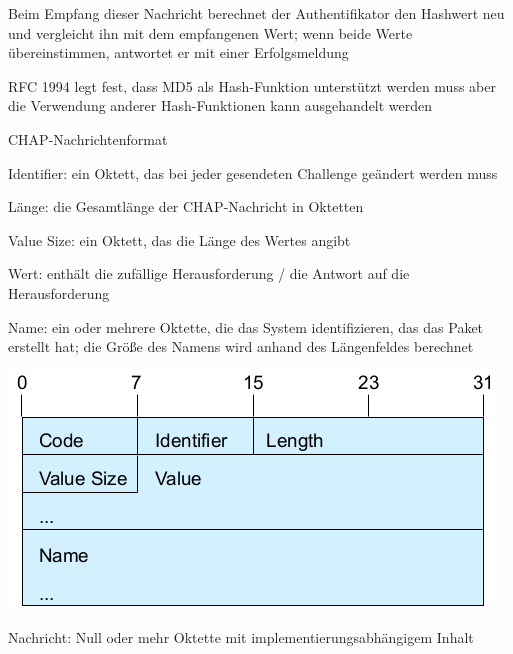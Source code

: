 \documentclass[a4paper]{article}
\begin{document}
\begin{multicols}{3}
\begin{itemize*}
\begin{itemize*}
                  \item Beim Empfang dieser Nachricht berechnet der Authentifikator den Hashwert neu und vergleicht ihn mit dem empfangenen Wert; wenn beide Werte übereinstimmen, antwortet er mit einer Erfolgsmeldung
                  \item RFC 1994 legt fest, dass MD5 als Hash-Funktion unterstützt werden muss aber die Verwendung anderer Hash-Funktionen kann ausgehandelt werden
            \end{itemize*}
            \item CHAP-Nachrichtenformat
            \begin{itemize*}
                  \item Identifier: ein Oktett, das bei jeder gesendeten Challenge geändert werden muss
                  \item Länge: die Gesamtlänge der CHAP-Nachricht in Oktetten
                  \item Value Size: ein Oktett, das die Länge des Wertes angibt
                  \item Wert: enthält die zufällige Herausforderung / die Antwort auf die Herausforderung
                  \item Name: ein oder mehrere Oktette, die das System identifizieren, das das Paket erstellt hat; die Größe des Namens wird anhand des Längenfeldes berechnet
                  \item \includegraphics[width=.5\linewidth]{Assets/NetworkSecurity-Point-to-Point-CHAP1.png}
                  \item Nachricht: Null oder mehr Oktette mit implementierungsabhängigem Inhalt
            \end{itemize*}

\end{itemize*}
\end{multicols}
\end{document}
